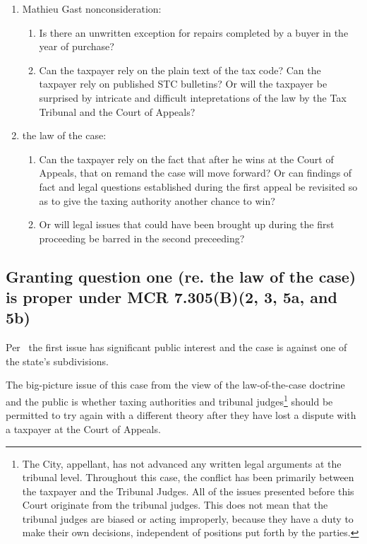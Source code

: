 \documentclass[12pt,\documentclassflag]{michiganCourtOfAppealsBrief}
\begin{document}
\begin{enumerate}
\item Mathieu Gast nonconsideration:
  \begin{enumerate}
  \item Is there an unwritten exception for repairs completed by a buyer in the year of purchase?
  \item Can the taxpayer rely on the plain text of the tax code? Can the taxpayer rely on published STC bulletins? Or will the taxpayer be surprised by intricate and difficult intepretations of the law by the Tax Tribunal and the Court of Appeals? 
  \end{enumerate}

\item the law of the case:
  \begin{enumerate}
  \item Can the taxpayer rely on the fact that after he wins at the Court of Appeals, that on remand the case will move forward? Or can findings of fact and legal questions established during the first appeal be revisited so as to give the taxing authority another chance to win?
  \item Or will legal issues that could have been brought up during the first proceeding be barred in the second preceeding?
  \end{enumerate}
\end{enumerate}

\subsection{Granting question one (re. the law of the case) is proper under MCR 7.305(B)(2, 3, 5a, and 5b)}

Per \cite{MCR 7.305(B)(2)}\ the first issue has significant public interest and the case is against one of the state's subdivisions.

The big-picture issue of this case from the view of the law-of-the-case doctrine and the public is whether taxing authorities and tribunal judges\footnote{The City, appellant, has not advanced any written legal arguments at the tribunal level. Throughout this case, the conflict has been primarily between the taxpayer and the Tribunal Judges. All of the issues presented before this Court originate from the tribunal judges. This does not mean that the tribunal judges are biased or acting improperly, because they have a duty to make their own decisions, independent of positions put forth by the parties.} should be permitted to try again with a different theory after they have lost a dispute with a taxpayer at the Court of Appeals.
\end{document}
